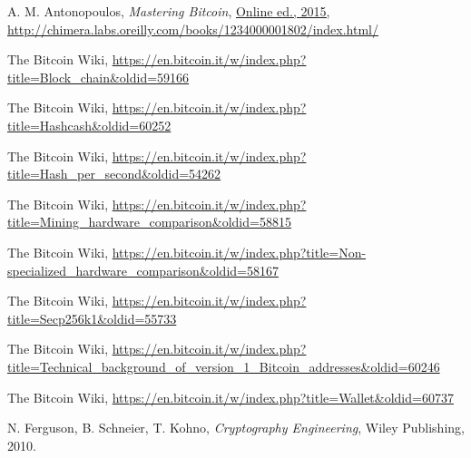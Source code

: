 \documentclass[a4paper,12pt]{article}
\begin{document}
\newpage
\begin{thebibliography}{9}

A. M. Antonopoulos,
\emph{Mastering Bitcoin},
\url{Online ed., 2015, http://chimera.labs.oreilly.com/books/1234000001802/index.html/}

\begin{comment}
PERMANENT BITWIKI LINKS:
https://en.bitcoin.it/w/index.php?title=Block_chain&oldid=59166 %
https://en.bitcoin.it/w/index.php?title=Hashcash&oldid=60252 %
https://en.bitcoin.it/w/index.php?title=Hash_per_second&oldid=54262 %
https://en.bitcoin.it/w/index.php?title=Mining_hardware_comparison&oldid=58815 %
https://en.bitcoin.it/w/index.php?title=Non-specialized_hardware_comparison&oldid=58167 %
https://en.bitcoin.it/w/index.php?title=Secp256k1&oldid=55733 %
https://en.bitcoin.it/w/index.php?title=Technical_background_of_version_1_Bitcoin_addresses&oldid=60246 %
https://en.bitcoin.it/w/index.php?title=Wallet&oldid=60737 %
\end{comment}

The Bitcoin Wiki,
\url{https://en.bitcoin.it/w/index.php?title=Block_chain&oldid=59166}

The Bitcoin Wiki,
\url{https://en.bitcoin.it/w/index.php?title=Hashcash&oldid=60252} %

The Bitcoin Wiki,
\url{https://en.bitcoin.it/w/index.php?title=Hash_per_second&oldid=54262} %

The Bitcoin Wiki,
\url{https://en.bitcoin.it/w/index.php?title=Mining_hardware_comparison&oldid=58815} %

The Bitcoin Wiki,
\url{https://en.bitcoin.it/w/index.php?title=Non-specialized_hardware_comparison&oldid=58167} %

The Bitcoin Wiki,
\url{https://en.bitcoin.it/w/index.php?title=Secp256k1&oldid=55733} %

The Bitcoin Wiki,
\url{https://en.bitcoin.it/w/index.php?title=Technical_background_of_version_1_Bitcoin_addresses&oldid=60246} %

The Bitcoin Wiki,
\url{https://en.bitcoin.it/w/index.php?title=Wallet&oldid=60737} %

N. Ferguson, B. Schneier, T. Kohno,
\emph{Cryptography Engineering},
Wiley Publishing,
2010.


\end{thebibliography}
\end{document}
